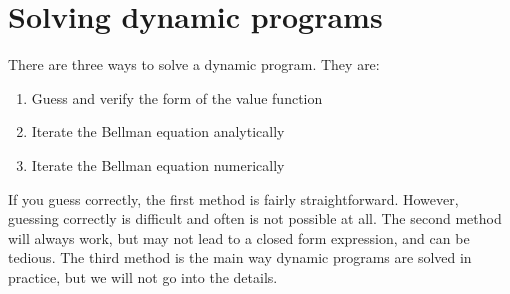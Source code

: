 \section{Solving dynamic programs} 

There are three ways to solve a dynamic program. They are:
\begin{enumerate}
\item Guess and verify the form of the value function
\item Iterate the Bellman equation analytically
\item Iterate the Bellman equation numerically
\end{enumerate}
If you guess correctly, the first method is fairly
straightforward. However, guessing correctly is difficult and often is
not possible at all. The second method will always work, but may not
lead to a closed form expression, and can be tedious. The third method
is the main way dynamic programs are solved in practice, but we will
not go into the details.


